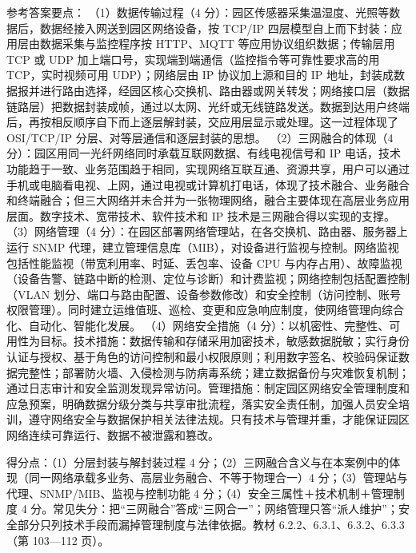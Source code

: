 \documentclass[a4paper,11pt]{article}
\begin{document}

\q 参考答案要点：
（1）数据传输过程（4 分）：园区传感器采集温湿度、光照等数据后，数据经接入网送到园区网络设备，按 TCP/IP 四层模型自上而下封装：应用层由数据采集与监控程序按 HTTP、MQTT 等应用协议组织数据；传输层用 TCP 或 UDP 加上端口号，实现端到端通信（监控指令等可靠性要求高的用 TCP，实时视频可用 UDP）；网络层由 IP 协议加上源和目的 IP 地址，封装成数据报并进行路由选择，经园区核心交换机、路由器或网关转发；网络接口层（数据链路层）把数据封装成帧，通过以太网、光纤或无线链路发送。数据到达用户终端后，再按相反顺序自下而上逐层解封装，交应用层显示或处理。这一过程体现了 OSI/TCP/IP 分层、对等层通信和逐层封装的思想。
（2）三网融合的体现（4 分）：园区用同一光纤网络同时承载互联网数据、有线电视信号和 IP 电话，技术功能趋于一致、业务范围趋于相同，实现网络互联互通、资源共享，用户可以通过手机或电脑看电视、上网，通过电视或计算机打电话，体现了技术融合、业务融合和终端融合；但三大网络并未合并为一张物理网络，融合主要体现在高层业务应用层面。数字技术、宽带技术、软件技术和 IP 技术是三网融合得以实现的支撑。
（3）网络管理（4 分）：在园区部署网络管理站，在各交换机、路由器、服务器上运行 SNMP 代理，建立管理信息库（MIB），对设备进行监视与控制。网络监视包括性能监视（带宽利用率、时延、丢包率、设备 CPU 与内存占用）、故障监视（设备告警、链路中断的检测、定位与诊断）和计费监视；网络控制包括配置控制（VLAN 划分、端口与路由配置、设备参数修改）和安全控制（访问控制、账号权限管理）。同时建立运维值班、巡检、变更和应急响应制度，使网络管理向综合化、自动化、智能化发展。
（4）网络安全措施（4 分）：以机密性、完整性、可用性为目标。技术措施：数据传输和存储采用加密技术，敏感数据脱敏；实行身份认证与授权、基于角色的访问控制和最小权限原则；利用数字签名、校验码保证数据完整性；部署防火墙、入侵检测与防病毒系统；建立数据备份与灾难恢复机制；通过日志审计和安全监测发现异常访问。管理措施：制定园区网络安全管理制度和应急预案，明确数据分级分类与共享审批流程，落实安全责任制，加强人员安全培训，遵守网络安全与数据保护相关法律法规。只有技术与管理并重，才能保证园区网络连续可靠运行、数据不被泄露和篡改。
\begin{analysis}得分点：（1）分层封装与解封装过程 4 分；（2）三网融合含义与在本案例中的体现（同一网络承载多业务、高层业务融合、不等于物理合一）4 分；（3）管理站与代理、SNMP/MIB、监视与控制功能 4 分；（4）安全三属性＋技术机制＋管理制度 4 分。常见失分：把“三网融合”答成“三网合一”；网络管理只答“派人维护”；安全部分只列技术手段而漏掉管理制度与法律依据。教材 6.2.2、6.3.1、6.3.2、6.3.3（第 103—112 页）。\end{analysis}
\end{document}

